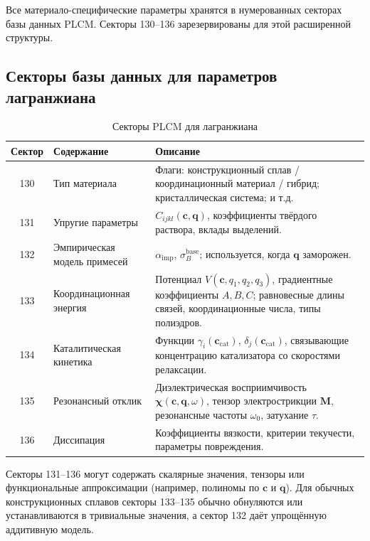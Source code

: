 \documentclass[12pt,a4paper]{article}
\begin{document}
	Все материало-специфические параметры хранятся в нумерованных секторах базы данных PLCM. Секторы 130–136 зарезервированы для этой расширенной структуры.
	
	\subsection{Секторы базы данных для параметров лагранжиана}
	\label{subsec:sectors}
	
	\begin{table}[htbp]
		\centering
		\caption{Секторы PLCM для лагранжиана}
		\label{tab:sectors}
		\begin{tabular}{clp{8cm}}
			\toprule
			\textbf{Сектор} & \textbf{Содержание} & \textbf{Описание} \\
			\midrule
			130 & Тип материала & Флаги: конструкционный сплав / координационный материал / гибрид; кристаллическая система; и т.д. \\
			131 & Упругие параметры & \(C_{ijkl}(\mathbf{c}, \mathbf{q})\), коэффициенты твёрдого раствора, вклады выделений. \\
			132 & Эмпирическая модель примесей & \(\alpha_{\mathrm{imp}}\), \(\sigma_B^{\mathrm{base}}\); используется, когда \(\mathbf{q}\) заморожен. \\
			133 & Координационная энергия & Потенциал \(V(\mathbf{c}, q_1,q_2,q_3)\), градиентные коэффициенты \(A,B,C\); равновесные длины связей, координационные числа, типы полиэдров. \\
			134 & Каталитическая кинетика & Функции \(\gamma_i(\mathbf{c}_{\mathrm{cat}})\), \(\delta_j(\mathbf{c}_{\mathrm{cat}})\), связывающие концентрацию катализатора со скоростями релаксации. \\
			135 & Резонансный отклик & Диэлектрическая восприимчивость \(\boldsymbol{\chi}(\mathbf{c},\mathbf{q},\omega)\), тензор электрострикции \(\mathbf{M}\), резонансные частоты \(\omega_0\), затухание \(\tau\). \\
			136 & Диссипация & Коэффициенты вязкости, критерии текучести, параметры повреждения. \\
			\bottomrule
		\end{tabular}
	\end{table}
	
	Секторы 131–136 могут содержать скалярные значения, тензоры или функциональные аппроксимации (например, полиномы по \(\mathbf{c}\) и \(\mathbf{q}\)). Для обычных конструкционных сплавов секторы 133–135 обычно обнуляются или устанавливаются в тривиальные значения, а сектор 132 даёт упрощённую аддитивную модель.
	
\end{document}
